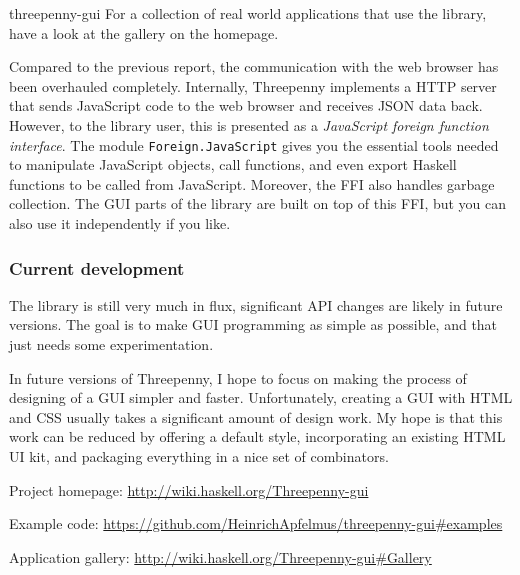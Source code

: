 \begin{hcarentry}[updated]{threepenny-gui}
For a collection of real world applications that use the library, have a look at the gallery on the homepage.

Compared to the previous report, the communication with the web browser has been overhauled completely. Internally, Threepenny implements a HTTP server that sends JavaScript code to the web browser and receives JSON data back. However, to the library user, this is presented as a \emph{JavaScript foreign function interface}. The module \verb`Foreign.JavaScript` gives you the essential tools needed to manipulate JavaScript objects, call functions, and even export Haskell functions to be called from JavaScript. Moreover, the FFI also handles garbage collection. The GUI parts of the library are built on top of this FFI, but you can also use it independently if you like.

\subsubsection*{Current development}

The library is still very much in flux, significant API changes are likely in future versions. The goal is to make GUI programming as simple as possible, and that just needs some experimentation.

In future versions of Threepenny, I hope to focus on making the process of designing of a GUI simpler and faster. Unfortunately, creating a GUI with HTML and CSS usually takes a significant amount of design work. My hope is that this work can be reduced by offering a default style, incorporating an existing HTML UI kit, and packaging everything in a nice set of combinators.

\FurtherReading
\begin{compactitem}
\item Project homepage: \url{http://wiki.haskell.org/Threepenny-gui}
\item Example code: \url{https://github.com/HeinrichApfelmus/threepenny-gui#examples}
\item Application gallery: \url{http://wiki.haskell.org/Threepenny-gui#Gallery}
\end{compactitem}
\end{hcarentry}
